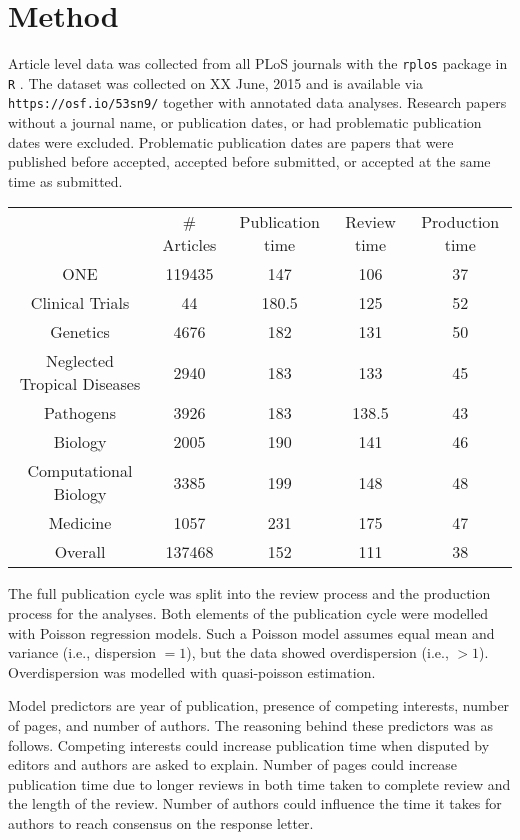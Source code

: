 \section*{Method}
Article level data was collected from all PLoS journals with the \texttt{rplos} package \cite[v0.4.7][]{rplos} in \texttt{R} \cite[v3.2.0][]{rcran}. The dataset was collected on XX June, 2015 and is available via \texttt{https://osf.io/53sn9/} together with annotated data analyses. Research papers without a journal name, or publication dates, or had problematic publication dates were excluded. Problematic publication dates are papers that were published before accepted, accepted before submitted, or accepted at the same time as submitted.

\begin{table}
\begin{tabular}{ c c c c c }
          & \# Articles & Publication time & Review time & Production time \\
    ONE   & 119435 & 147   & 106   & 37 \\
    Clinical Trials & 44    & 180.5 & 125   & 52 \\
    Genetics & 4676  & 182   & 131   & 50 \\
    Neglected Tropical Diseases & 2940  & 183   & 133   & 45 \\
    Pathogens & 3926  & 183   & 138.5 & 43 \\
    Biology & 2005  & 190   & 141   & 46 \\
    Computational Biology & 3385  & 199   & 148   & 48 \\
    Medicine & 1057  & 231   & 175   & 47 \\
    Overall & 137468 & 152   & 111   & 38 \\
\end{tabular}
\end{table}

The full publication cycle was split into the review process and the production process for the analyses. Both elements of the publication cycle were modelled with Poisson regression models. Such a Poisson model assumes equal mean and variance (i.e., dispersion $=1$), but the data showed overdispersion (i.e., $>1$). Overdispersion was modelled with quasi-poisson estimation.

Model predictors are year of publication, presence of competing interests, number of pages, and number of authors. The reasoning behind these predictors was as follows. Competing interests could increase publication time when disputed by editors and authors are asked to explain. Number of pages could increase publication time due to longer reviews in both time taken to complete review and the length of the review. Number of authors could influence the time it takes for authors to reach consensus on the response letter. 

